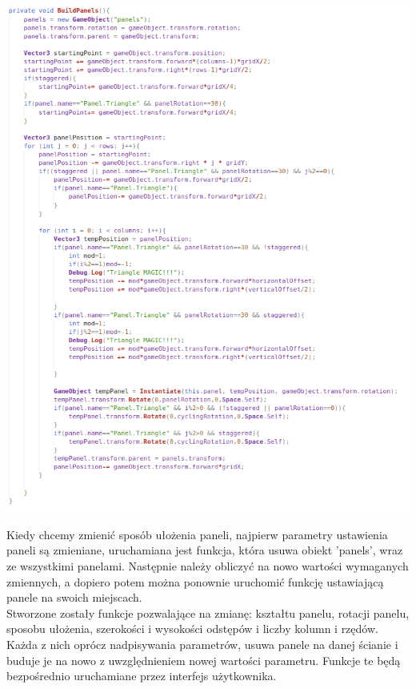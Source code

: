 \documentclass{article} %
\begin{document}
            \begin{center}
            \includegraphics[scale=0.7]{images/screenshots/code/code_000.png}
            \end{center}

            
            Kiedy chcemy zmienić sposób ułożenia paneli, najpierw parametry ustawienia paneli są zmieniane, uruchamiana jest funkcja, która usuwa obiekt 'panels', wraz ze wszystkimi panelami. Następnie należy obliczyć na nowo wartości wymaganych zmiennych, a dopiero potem można ponownie uruchomić funkcję ustawiającą panele na swoich miejscach.
            \\
            
            Stworzone zostały funkcje pozwalające na zmianę: kształtu panelu, rotacji panelu, sposobu ułożenia, szerokości i wysokości odstępów i liczby kolumn i rzędów. Każda z nich oprócz nadpisywania parametrów, usuwa panele na danej ścianie i buduje je na nowo z uwzględnieniem nowej wartości parametru. Funkcje te będą bezpośrednio uruchamiane przez interfejs użytkownika.
            \\
            
\end{document}
